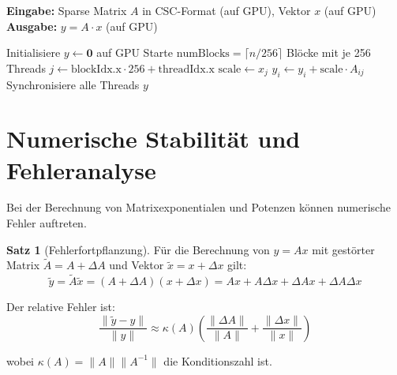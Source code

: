 \documentclass[a4paper,12pt]{report}
\theoremstyle{definition}
\newtheorem{satz}{Satz}
\begin{document}
	\begin{algorithm}[H]
		\caption{GPU-beschleunigte sparse Matrix-Vektor-Multiplikation}
		\label{alg:gpu-sparse-matvec}
		\textbf{Eingabe:} Sparse Matrix $A$ in CSC-Format (auf GPU), Vektor $x$ (auf GPU) \\
		\textbf{Ausgabe:} $y = A \cdot x$ (auf GPU)
		\begin{algorithmic}[1]
			\State Initialisiere $y \gets \mathbf{0}$ auf GPU
			\State Starte $\text{numBlocks} = \lceil n / 256 \rceil$ Blöcke mit je 256 Threads
			\State $j \gets \text{blockIdx.x} \cdot 256 + \text{threadIdx.x}$
			\State $\text{scale} \gets x_j$
			\State $y_i \gets y_i + \text{scale} \cdot A_{ij}$ 
			\EndFor
			\EndIf
			\EndFor
			\State Synchronisiere alle Threads
			\State \Return $y$
		\end{algorithmic}
	\end{algorithm}
	
	\section{Numerische Stabilität und Fehleranalyse}
	
	Bei der Berechnung von Matrixexponentialen und Potenzen können numerische Fehler auftreten.
	
	\begin{satz}[Fehlerfortpflanzung]
		Für die Berechnung von $y = A x$ mit gestörter Matrix $\tilde{A} = A + \Delta A$ und Vektor $\tilde{x} = x + \Delta x$ gilt:
		\[
		\tilde{y} = \tilde{A} \tilde{x} = (A + \Delta A)(x + \Delta x) = Ax + A \Delta x + \Delta A x + \Delta A \Delta x
		\]
		
		Der relative Fehler ist:
		\[
		\frac{\|\tilde{y} - y\|}{\|y\|} \approx \kappa(A) \left( \frac{\|\Delta A\|}{\|A\|} + \frac{\|\Delta x\|}{\|x\|} \right)
		\]
		
		wobei $\kappa(A) = \|A\| \|A^{-1}\|$ die Konditionszahl ist.
	\end{satz}
	
\end{document}
